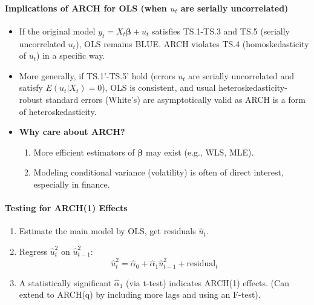 \documentclass[a4paper, 10pt]{article}
\theoremstyle{definition}	%
\begin{document}
\paragraph{Implications of ARCH for OLS (when \(u_t\) are serially uncorrelated)}
\begin{itemize}
    \item If the original model \(y_t = X_t\boldsymbol{\beta} + u_t\) satisfies TS.1-TS.3 and TS.5 (serially uncorrelated \(u_t\)), OLS remains BLUE. ARCH violates TS.4 (homoskedasticity of \(u_t\)) in a specific way.
    \item More generally, if TS.1'-TS.5' hold (errors \(u_t\) are serially uncorrelated and satisfy \(E(u_t|X_t)=0\)), OLS is consistent, and usual heteroskedasticity-robust standard errors (White's) are asymptotically valid as ARCH is a form of heteroskedasticity.
    \item \textbf{Why care about ARCH?}
    \begin{enumerate}
        \item More efficient estimators of \(\boldsymbol{\beta}\) may exist (e.g., WLS, MLE).
        \item Modeling conditional variance (volatility) is often of direct interest, especially in finance.
    \end{enumerate}
\end{itemize}

\paragraph{Testing for ARCH(1) Effects}
\begin{enumerate}
    \item Estimate the main model by OLS, get residuals \(\hat{u}_t\).
    \item Regress \(\hat{u}_t^2\) on \(\hat{u}_{t-1}^2\):
    \[ \hat{u}_t^2 = \hat{\alpha}_0 + \hat{\alpha}_1 \hat{u}_{t-1}^2 + \text{residual}_t \]
    \item A statistically significant \(\hat{\alpha}_1\) (via t-test) indicates ARCH(1) effects. (Can extend to ARCH(q) by including more lags and using an F-test).
\end{enumerate}
\end{document}
